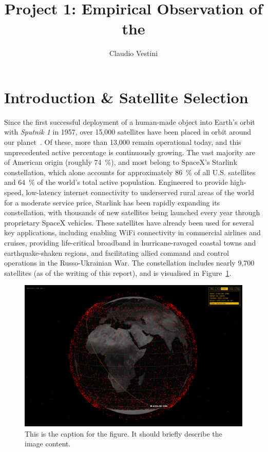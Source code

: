 \documentclass{article}
\title{Project 1: Empirical Observation of the }
\author{Claudio Vestini}
\begin{document}
\maketitle

\section{Introduction \& Satellite Selection}

Since the first successful deployment of a human-made object into Earth's orbit with \textit{Sputnik 1} in 1957, over 15,000 satellites have been placed in orbit around our planet~\cite{lookup-lepoint2025}. Of these, more than 13,000 remain operational today, and this unprecedented active percentage is continuously growing. The vast majority are of American origin (roughly \SI{74}{\percent}), and most belong to SpaceX's Starlink constellation, which alone accounts for approximately \SI{86}{\percent} of all U.S. satellites and \SI{64}{\percent} of the world's total active population. Engineered to provide high-speed, low-latency internet connectivity to underserved rural areas of the world for a moderate service price, Starlink has been rapidly expanding its constellation, with thousands of new satellites being launched every year through proprietary SpaceX vehicles. These satellites have already been used for several key applications, including enabling WiFi connectivity in commercial airlines and cruises, providing life-critical broadband in hurricane-ravaged coastal towns and earthquake-shaken regions, and facilitating allied command and control operations in the Russo-Ukrainian War. The constellation includes nearly 9,700 satellites (as of the writing of this report), and is visualised in Figure~\ref{fig:constellation}.

\begin{figure}[h!]
    \centering
    \includegraphics[width=\textwidth]{LaTeX/Figures/Starlink Constellation.png}
    \caption{This is the caption for the figure. It should briefly describe the image content.}
    \label{fig:constellation}
\end{figure}
\end{document}
